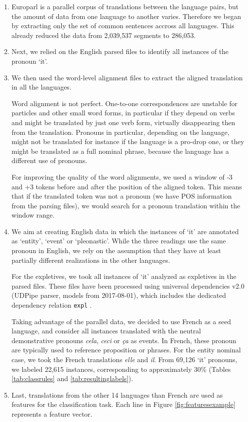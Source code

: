 \documentclass[10pt, a4paper]{article} \usepackage{lrec} \usepackage{multibib}
\begin{document}
\begin{enumerate}\setlength\itemsep{1em}

\item Europarl is a parallel corpus of translations
between the language pairs, but the amount of data from one language to another
varies. Therefore we began by extracting only the set of common sentences
accross all languages. This already reduced the data from 2,039,537 segments to
286,053.

\item  Next, we relied on the English parsed files to
identify all instances of the pronoun `it'.

\item We then used the word-level alignment files to
extract the aligned translation in all the languages.

Word alignment is not perfect. One-to-one correspondences are unstable for
particles and other small word forms, in particular if they depend on verbs and might
be translated by just one verb form, virtually disappearing then from the
translation. Pronouns in particular, depending on the language, might not be
translated for instance if the language is a pro-drop one, or they might be
translated as a full nominal phrase, because the language has a different use of
pronouns.

For improving the quality of the word alignments, we used a window of -3 and
+3 tokens before and after the position of the aligned token. This means that if
the translated token was not a pronoun (we have POS information from the parsing
files), we would search for a pronoun translation within the window range.

\item We aim at creating English data in which the instances of
`it' are annotated as `entity', `event' or `pleonastic'. While the three
readings use the same pronoun in English, we rely on the assumption that they
have at least partially different realizations in the other languages.

For the expletives, we took all instances of `it' analyzed as expletives in the
parsed files. These files have been processed using universal dependencies v2.0
(UDPipe parser, models from 2017-08-01), which includes the dedicated dependency
relation \texttt{expl} \cite{bouma-etal-2018-expletives}.

Taking advantage of the parallel data, we decided to use French as a seed language, and
consider all instances translated with the neutral demonstrative pronouns
\textit{cela}, \textit{ceci} or \textit{ça} as events. In French, these pronoun
are typically used to reference proposition or phrases. For the entity nominal
case, we took the French translations \textit{elle} and \textit{il}. From 69,126
`it' pronouns, we labeled 22,615 instances, corresponding to approximately 30\%
(Tables \ref{tab:classrules} and \ref{tab:resultinglabels}).

\item Last, translations from the other 14 languages than French are used as features for
the classification task. Each line in Figure \ref{fig:featuresexample}
represents a feature vector.

\end{enumerate}
\end{document}
